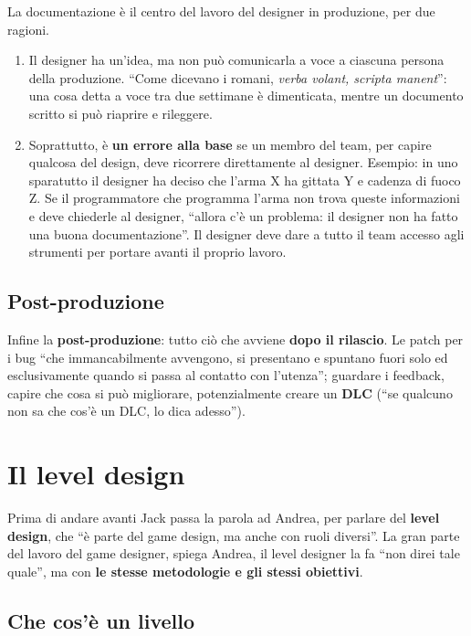 La documentazione è il centro del lavoro del designer in produzione, per due
ragioni.
\begin{enumerate}
  \item Il designer ha un'idea, ma non può comunicarla a voce a ciascuna
        persona della produzione. ``Come dicevano i romani, \emph{verba
        volant, scripta manent}'': una cosa detta a voce tra due settimane
        è dimenticata, mentre un documento scritto si può riaprire e
        rileggere.
  \item Soprattutto, è \textbf{un errore alla base} se un membro del team,
        per capire qualcosa del design, deve ricorrere direttamente al
        designer. Esempio: in uno sparatutto il designer ha deciso che
        l'arma X ha gittata Y e cadenza di fuoco Z. Se il programmatore che
        programma l'arma non trova queste informazioni e deve chiederle al
        designer, ``allora c'è un problema: il designer non ha fatto una
        buona documentazione''. Il designer deve dare a tutto il team
        accesso agli strumenti per portare avanti il proprio lavoro.
\end{enumerate}

\subsection{Post-produzione}

Infine la \textbf{post-produzione}: tutto ciò che avviene \textbf{dopo il
rilascio}. Le patch per i bug ``che immancabilmente avvengono, si presentano
e spuntano fuori solo ed esclusivamente quando si passa al contatto con
l'utenza''; guardare i feedback, capire che cosa si può migliorare,
potenzialmente creare un \textbf{DLC} (``se qualcuno non sa che cos'è un DLC,
lo dica adesso'').

\section{Il level design}
\label{p2:sec:level}

Prima di andare avanti Jack passa la parola ad Andrea, per parlare del
\textbf{level design}, che ``è parte del game design, ma anche con ruoli
diversi''. La gran parte del lavoro del game designer, spiega Andrea, il
level designer la fa ``non direi tale quale'', ma con \textbf{le stesse
metodologie e gli stessi obiettivi}.

\subsection{Che cos'è un livello}

